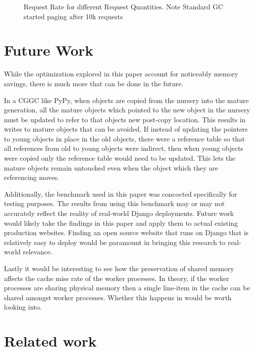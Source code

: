 \documentclass{article}
\begin{document}
\begin{sloppypar}
\begin{figure}
    \resizebox{0.5\textwidth}{!}{}
    \caption{Request Rate for different Request Quantities.  Note Standard GC started paging after 10k requests}\label{fig:latency}
\end{figure}

\section{Future Work}\label{sec:futurework}

While the optimization explored in this paper account for noticeably memory savings, there is much more that can be done in the future.

In a CGGC like PyPy, when objects are copied from the nursery into the mature generation, all the mature objects which pointed to the new object in the nursery must be updated to refer to that objects new post-copy location.  This results in writes to mature objects that can be avoided.  If instead of updating the pointers to young objects in place in the old objects, there were a reference table so that all references from old to young objects were indirect, then when young objects were copied only the reference table would need to be updated.  This lets the mature objects remain untouched even when the object which they are referencing moves.  

Additionally, the benchmark used in this paper was concocted specifically for testing purposes.  The results from using this benchmark may or may not accurately reflect the reality of real-world Django deployments.  Future work would likely take the findings in this paper and apply them to actual existing production websites.  Finding an open source website that runs on Django that is relatively easy to deploy would be paramount in bringing this research to real-world relevance.  

Lastly it would be interesting to see how the preservation of shared memory affects the cache miss rate of the worker processes.  In theory, if the worker processes are sharing physical memory then a single line-item in the cache can be shared amongst worker processes.  Whether this happens in would be worth looking into.  

\section{Related work}\label{sec:relatedwork}


\end{sloppypar}
\end{document}
